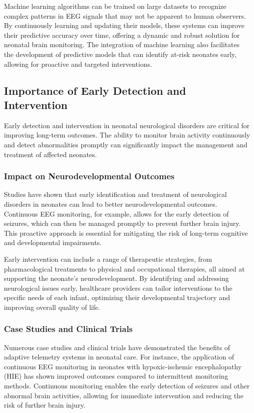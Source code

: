 \documentclass[12pt,journal,compsoc]{IEEEtran}
\begin{document}
Machine learning algorithms can be trained on large datasets to recognize complex patterns in EEG signals that may not be apparent to human observers. By continuously learning and updating their models, these systems can improve their predictive accuracy over time, offering a dynamic and robust solution for neonatal brain monitoring. The integration of machine learning also facilitates the development of predictive models that can identify at-risk neonates early, allowing for proactive and targeted interventions.

\subsection{Importance of Early Detection and Intervention}

Early detection and intervention in neonatal neurological disorders are critical for improving long-term outcomes. The ability to monitor brain activity continuously and detect abnormalities promptly can significantly impact the management and treatment of affected neonates.

\subsubsection{Impact on Neurodevelopmental Outcomes}

Studies have shown that early identification and treatment of neurological disorders in neonates can lead to better neurodevelopmental outcomes. Continuous EEG monitoring, for example, allows for the early detection of seizures, which can then be managed promptly to prevent further brain injury. This proactive approach is essential for mitigating the risk of long-term cognitive and developmental impairments.

Early intervention can include a range of therapeutic strategies, from pharmacological treatments to physical and occupational therapies, all aimed at supporting the neonate's neurodevelopment. By identifying and addressing neurological issues early, healthcare providers can tailor interventions to the specific needs of each infant, optimizing their developmental trajectory and improving overall quality of life.

\subsubsection{Case Studies and Clinical Trials}

Numerous case studies and clinical trials have demonstrated the benefits of adaptive telemetry systems in neonatal care. For instance, the application of continuous EEG monitoring in neonates with hypoxic-ischemic encephalopathy (HIE) has shown improved outcomes compared to intermittent monitoring methods. Continuous monitoring enables the early detection of seizures and other abnormal brain activities, allowing for immediate intervention and reducing the risk of further brain injury.
\end{document}
